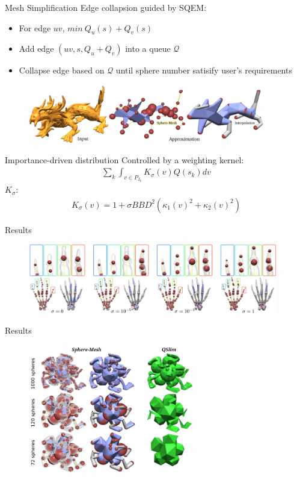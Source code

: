 \documentclass{beamer}
\begin{document}
\begin{frame}{Mesh Simplification}
Edge collapsion guided by SQEM:
\begin{itemize}
\item For edge $uv$, $min\: Q_u(s) + Q_v(s)$
\item Add edge $(uv, s, Q_u+Q_v)$ into a queue $\mathcal{Q}$
\item Collapse edge based on $\mathcal{Q}$ until sphere number satisify user's requirements
\end{itemize}
\begin{figure}
\includegraphics[height=1.0in]{./img/simplification.png}
\end{figure}
\end{frame}

\begin{frame}{Importance-driven distribution}
Controlled by a weighting kernel:
\begin{eqnarray}
\sum_k \int_{v\in P_{I_k}} \boxed{K_\sigma(v)} Q(s_k)dv
\end{eqnarray}
$K_\sigma$:
\begin{eqnarray}
K_\sigma(v) = 1 + \sigma BBD^2(\kappa_1(v)^2+\kappa_2(v)^2)
\end{eqnarray}
\end{frame}

\begin{frame}{Results}
\begin{figure}
\includegraphics[height=1.2in]{./img/importance.png}
\end{figure}
\end{frame}

\begin{frame}{Results}
\begin{figure}
\includegraphics[height=2.2in]{./img/compare.png}
\end{figure}
\end{frame}
\end{document}

